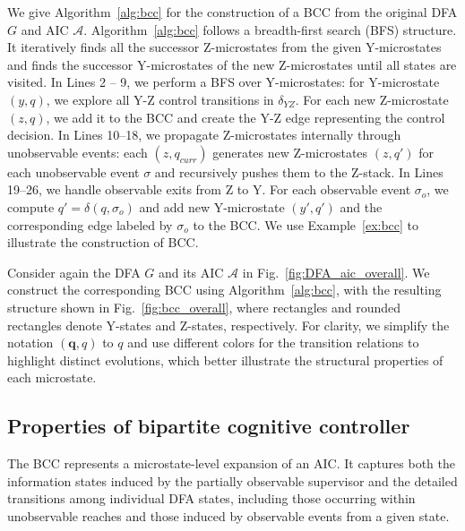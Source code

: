 \documentclass[journal,twoside,web]{ieeecolor}
\begin{document}
We give Algorithm~\ref{alg:bcc} for the construction of a BCC from the original DFA $G$ and AIC $\mathcal{A}$.
% 
Algorithm~\ref{alg:bcc} follows a breadth-first search (BFS) structure.
It iteratively finds all the successor Z-microstates from the given Y-microstates and finds the successor Y-microstates of the new Z-microstates until all states are visited.
%
In Lines 2 -- 9, we perform a BFS over Y-microstates: for Y-microstate $(y,q)$, we explore all Y-Z control transitions in $\delta_{YZ}$.
For each new Z-microstate $(z,q)$, we add it to the BCC and create the Y-Z edge representing the control decision.
%
In Lines 10--18, we propagate Z-microstates internally through unobservable events: each $(z,q_{curr})$ generates new Z-microstates $(z,q')$ for each unobservable event $\sigma$ and recursively pushes them to the Z-stack.
%
In Lines 19--26, we handle observable exits from Z to Y.
For each observable event $\sigma_o$, we compute $q' = \delta(q, \sigma_o)$ and add new Y-microstate $(y',q')$ and the corresponding edge labeled by $\sigma_o$ to the BCC.
We use Example~\ref{ex:bcc} to illustrate the construction of BCC.
\begin{example}\label{ex:bcc}
    Consider again the DFA $G$ and its AIC $\mathcal{A}$ in Fig.~\ref{fig:DFA_aic_overall}. 
    We construct the corresponding BCC using Algorithm~\ref{alg:bcc}, with the resulting structure shown in Fig.~\ref{fig:bcc_overall}, where rectangles and rounded rectangles denote Y-states and Z-states, respectively. 
    For clarity, we simplify the notation $(\bm{q}, q)$ to $q$ and use different colors for the transition relations to highlight distinct evolutions, which better illustrate the structural properties of each microstate.
\end{example}

\subsection{Properties of bipartite cognitive controller}

The BCC represents a microstate-level expansion of an AIC. 
It captures both the information states induced by the partially observable supervisor and the detailed transitions among individual DFA states, including those occurring within unobservable reaches and those induced by observable events from a given state.
\end{document}
